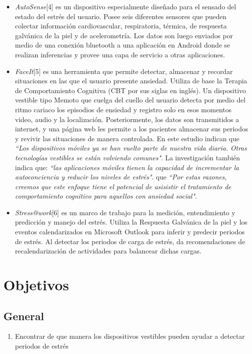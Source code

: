 \documentclass[letterpaper,12pt]{cicese}
\begin{document}
				\begin{itemize}
					\item{\emph{AutoSense}[4]} es un dispositivo especialmente dise\~nado para el sensado del estado del estr\'es del usuario. Posee seis diferentes
					sensores que pueden colectar informaci\'on cardiovascular, respiratoria, térmica, de respuesta galv\'anica de la piel y de acelerometr\'ia. Los
					datos son luego enviados por medio de una conexi\'on bluetooth a una aplicaci\'on en Android donde se realizan inferencias y provee una capa de 
					servicio a otras aplicaciones.
		
					\item{\emph{FaceIt}[5]} es una herramienta que permite detectar, almacenar y recordar situaciones en las que el usuario presente ansiedad. Utiliza
					de base la Terapia de Comportamiento Cognitiva (CBT por sus siglas en ingl\'es). Un dispositivo vestible tipo Memoto que cuelga del cuello del usuario
					detecta por medio del ritmo cariaco los episodios de ensiedad y registro solo en esos momentos video, audio y la localizaci\'on. Posteriormente,
					los datos son transmitidos a internet, y una p\'agina web les permite a los pacientes almacenar sus periodos y revivir las situaciones de manera
					controlada. En este estudio indican que \emph{``Los dispositivos m\'oviles ya se han vuelto parte de nuestra vida diaria. Otras tecnolog\'ias vestibles 					se est\'an volviendo comunes"}. La investigaci\'on tambi\'en indica que: \emph{``las aplicaciones m\'oviles tienen la capacidad de incrementar
					la autoconciencia y reducir los niveles de estr\'es"}.  que \emph{``Por estas razones, creemos que este enfoque tiene el potencial de asisistir
					el tratamiento de comportamiento cognitivo para aquellos con ansiedad social"}.

					\item{\emph{Stress@work}[6]} es un marco de trabajo para la medici\'on, entendimiento y predicci\'on y manejo del estr\'es. Utiliza la Respuesta
					Galv\'anica de la piel y los eventos calendarizados en Microsoft Outlook para inferir y predecir periodos de estr\'es. Al detectar los periodos de
					carga de estr\'es, da recomendaciones de recalendarizaci\'on de actividades para balancear dichas cargas.
				\end{itemize}
		\chapter{Objetivos}
			\section{General}
				\begin{enumerate}
					\item Encontrar de que manera los dispositivos vestibles pueden ayudar a detectar periodos de estr\'es
				\end{enumerate}
\end{document}
